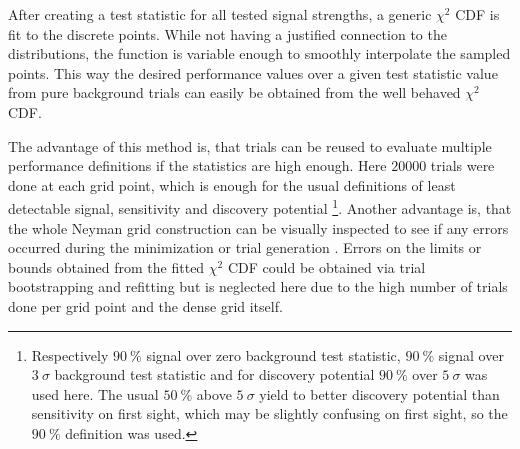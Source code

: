After creating a test statistic for all tested signal strengths, a generic $\chi^2$ CDF is fit to the discrete points.
While not having a justified connection to the distributions, the function is variable enough to smoothly interpolate the sampled points.
This way the desired performance values over a given test statistic value from pure background trials can easily be obtained from the well behaved $\chi^2$ CDF.

The advantage of this method is, that trials can be reused to evaluate multiple performance definitions if the statistics are high enough.
Here $\num{20000}$ trials were done at each grid point, which is enough for the usual definitions of least detectable signal, sensitivity and discovery potential \footnote{Respectively $\SI{90}{\percent}$ signal over zero background test statistic, $\SI{90}{\percent}$ signal over $\SI{3}{\sigma}$ background test statistic and for discovery potential $\SI{90}{\percent}$ over $\SI{5}{\sigma}$ was used here. The usual $\SI{50}{\percent}$ above $\SI{5}{\sigma}$ yield to better discovery potential than sensitivity on first sight, which may be slightly confusing on first sight, so the $\SI{90}{\percent}$ definition was used.}.
Another advantage is, that the whole Neyman grid construction can be visually inspected to see if any errors occurred during the minimization or trial generation .
Errors on the limits or bounds obtained from the fitted $\chi^2$ CDF could be obtained via trial bootstrapping and refitting but is neglected here due to the high number of trials done per grid point and the dense grid itself.


